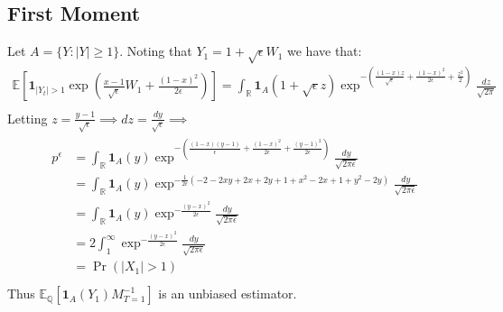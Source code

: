 \documentclass[11pt]{amsart}
\newcommand{\want}{p^{\epsilon}}
\newcommand{\noise}{\sqrt{\epsilon}}
\newcommand{\E}{\mathbb{E}}
\newcommand{\ind}{\mathbf{1}}
\newcommand{\R}{\mathbb{R}}
\begin{document}
\subsection{First Moment}
Let $ A = \{ Y : |Y| \geq 1 \}$. Noting that $Y_1 = 1 + \noise W_1$
we have that: 
\begin{align}
  \E\left [ \ind_{ |Y_t| > 1 } \exp \left (
     \frac{x-1}{\noise} W_1 +\frac{(1-x)^2}{2\epsilon} \right ) \right ] =
   \int_{\R} \ind_{A}(1+\noise z)\exp^{-(\frac{(1-x)z}{\noise}+\frac{(1-x)^2}{2\epsilon}+\frac{z^2}{2})} \frac{dz}{\sqrt{2\pi}} \\
\end{align}
Letting $z = \frac{y-1}{\noise} \implies dz = \frac{dy}{\noise} \implies $ 
\begin{align}
  \begin{split}
    \want &= \int_{\R} \ind_{A}(y)
    \exp^{-(\frac{(1-x)(y-1)}{\epsilon}+\frac{(1-x)^2}{2\epsilon}+\frac{(y-1)^2}{2\epsilon})}
    \frac{dy}{\sqrt{2\pi\epsilon}} \\
    &= \int_{\R} \ind_{A}(y)
    \exp^{-\frac{1}{2\epsilon} (-2 - 2xy +2x +2y + 1 + x^2 -2x + 1 +y^2 -2y  )}
    \frac{dy}{\sqrt{2\pi\epsilon}} \\ 
    &= \int_{\R} \ind_{A}(y) \exp^{-\frac{(y-x)^2}{2\epsilon}}
    \frac{dy}{\sqrt{2\pi\epsilon}} \\
    &= 2\int_{1}^{\infty} \exp^{-\frac{(y-x)^2}{2\epsilon}}
    \frac{dy}{\sqrt{2\pi\epsilon}} \\
    &= \Pr( |X_1| > 1 ) \\
  \end{split}
\end{align}
Thus $\E_{\mathbb{Q}}[\ind_{A}(Y_1) M_{T=1}^{-1}]$ is an unbiased estimator. 
\end{document}
